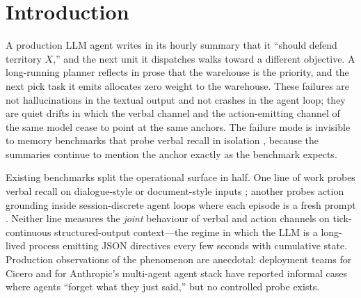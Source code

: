 \section{Introduction}
\label{sec:intro}

A production LLM agent writes in its hourly summary that it
``should defend territory $X$,'' and the next unit it dispatches
walks toward a different objective. A long-running planner reflects
in prose that the warehouse is the priority, and the next pick task
it emits allocates zero weight to the warehouse. These failures are
not hallucinations in the textual output and not crashes in the
agent loop; they are quiet drifts in which the verbal channel and
the action-emitting channel of the same model cease to point at the
same anchors. The failure mode is invisible to memory benchmarks
that probe verbal recall in isolation
\citep{Wu2025LongMemEval, Hsieh2024RULER, Liu2024LostInMiddle,
He2026MemoryArena}, because the summaries continue to mention the
anchor exactly as the benchmark expects.

Existing benchmarks split the operational surface in half. One line
of work probes verbal recall on dialogue-style or document-style
inputs \citep{Wu2025LongMemEval, Hsieh2024RULER, Liu2024LostInMiddle};
another probes action grounding inside session-discrete agent loops
where each episode is a fresh prompt
\citep{He2026MemoryArena, Hu2025MemoryAgentBench}. Neither line
measures the \emph{joint} behaviour of verbal and action channels
on tick-continuous structured-output context---the regime in which
the LLM is a long-lived process emitting JSON directives every few
seconds with cumulative state. Production observations of the
phenomenon are anecdotal: deployment teams for Cicero
\citep{FAIR2022Cicero} and for Anthropic's multi-agent agent stack
\citep{AnthropicMultiAgent2025} have reported informal cases where
agents ``forget what they just said,'' but no controlled probe
exists.

